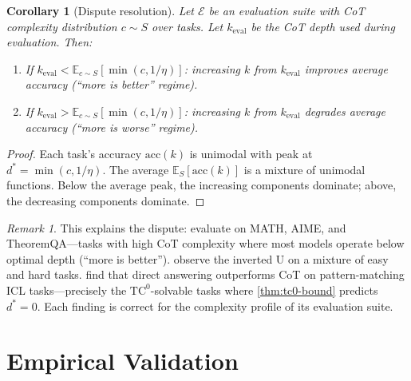 \documentclass{article}
\newtheorem{corollary}[theorem]{Corollary}
\theoremstyle{definition}
\theoremstyle{remark}
\newtheorem{remark}[theorem]{Remark}
\providecommand{\TC}{\mathrm{TC}^0}
\newcommand{\depth}{d^*}       %
\newcommand{\noise}{\eta}      %
\newcommand{\acc}{\mathrm{acc}} %
\newcommand{\ccot}{c}          %
\newcommand{\E}{\mathbb{E}}
\begin{document}
\begin{corollary}[Dispute resolution]
\label{cor:dispute}
Let $\mathcal{E}$ be an evaluation suite with CoT complexity distribution $\ccot \sim S$ over tasks. Let $k_{\mathrm{eval}}$ be the CoT depth used during evaluation. Then:
\begin{enumerate}
\item If $k_{\mathrm{eval}} < \E_{c \sim S}[\min(c, 1/\noise)]$: increasing $k$ from $k_{\mathrm{eval}}$ improves average accuracy (``more is better'' regime).
\item If $k_{\mathrm{eval}} > \E_{c \sim S}[\min(c, 1/\noise)]$: increasing $k$ from $k_{\mathrm{eval}}$ degrades average accuracy (``more is worse'' regime).
\end{enumerate}
\end{corollary}

\begin{proof}
Each task's accuracy $\acc(k)$ is unimodal with peak at $\depth = \min(c, 1/\noise)$. The average $\E_S[\acc(k)]$ is a mixture of unimodal functions. Below the average peak, the increasing components dominate; above, the decreasing components dominate.
\end{proof}

\begin{remark}
This explains the dispute: \citet{yeo2025demystifying} evaluate on MATH, AIME, and TheoremQA---tasks with high CoT complexity where most models operate below optimal depth (``more is better''). \citet{wu2025when} observe the inverted U on a mixture of easy and hard tasks. \citet{zheng2025curse} find that direct answering outperforms CoT on pattern-matching ICL tasks---precisely the $\TC$-solvable tasks where \cref{thm:tc0-bound} predicts $\depth = 0$. Each finding is correct for the complexity profile of its evaluation suite.
\end{remark}

\section{Empirical Validation}
\label{sec:experiments}

%
%
%
%
%
%
\end{document}
